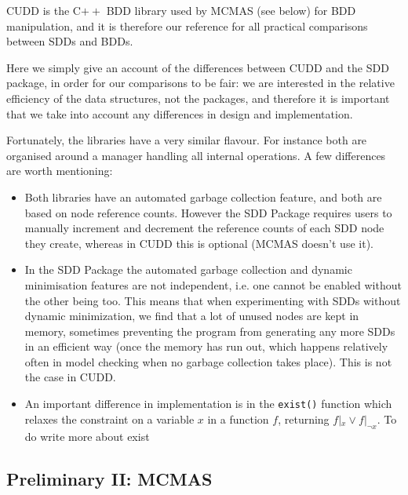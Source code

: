 \documentclass[11pt]{article}
\begin{document}
CUDD is the C$++$ BDD library used by MCMAS (see below) for BDD manipulation, and it is therefore our reference for all practical comparisons between SDDs and BDDs. 

Here we simply give an account of the differences between  CUDD and the SDD package, in order for our comparisons to be fair: we are interested in the relative efficiency of the data structures, not the packages, and therefore it is important that we take into account any differences in design and implementation. 

Fortunately, the libraries have a very similar flavour. For instance both are organised around a manager handling all internal operations. A few differences are worth mentioning:
\begin{itemize}
\item Both libraries have an automated garbage collection feature, and both are based on node reference counts. However the SDD Package requires users to manually increment and decrement the reference counts of each SDD node they create, whereas in CUDD this is optional (MCMAS doesn't use it). 
\item In the SDD Package the automated garbage collection and dynamic minimisation features are not independent, i.e. one cannot be enabled without the other being too. This means that when experimenting with SDDs without dynamic minimization, we find that a lot of unused nodes are kept in memory, sometimes preventing the program from generating any more SDDs in an efficient way (once the memory has run out, which happens relatively often in model checking when no garbage collection takes place). This is not the case in CUDD. 
\item An important difference in implementation is in the \texttt{exist()} function which relaxes the constraint on a variable $x$ in a function $f$, returning $f|_x \lor f|_{\lnot x}$. 
To do write more about exist
\end{itemize}
\label{gc}

\subsection{Preliminary II: MCMAS} 
\end{document}
